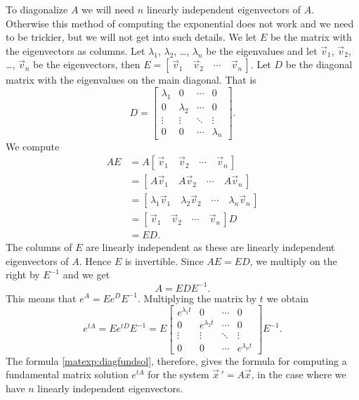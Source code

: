 \documentclass[12pt]{book}
\begin{document}
To diagonalize $A$
we will need $n$ linearly independent eigenvectors of $A$.
Otherwise this method of computing the exponential does not work and we need to be trickier, but we will
not get into such details.
We let $E$ be the matrix with the eigenvectors as columns.  
Let $\lambda_1$, $\lambda_2$, \ldots, $\lambda_n$ be the eigenvalues and
let $\vec{v}_1$, $\vec{v}_2$, \ldots, $\vec{v}_n$ be the eigenvectors, then
$E = [\, \vec{v}_1 \quad \vec{v}_2 \quad \cdots \quad \vec{v}_n \,]$.
Let $D$ be the diagonal matrix with the eigenvalues on the main diagonal.
That is
\begin{equation*}
D =
\begin{bmatrix}
\lambda_1 & 0 & \cdots & 0 \\
0 & \lambda_2 & \cdots & 0 \\
\vdots & \vdots & \ddots & \vdots \\
0 & 0 & \cdots & \lambda_n
\end{bmatrix} .
\end{equation*}
We compute
\begin{equation*}
\begin{split}
AE & = A 
[\, \vec{v}_1 \quad \vec{v}_2 \quad \cdots \quad \vec{v}_n \,]
\\
& =
[\, A\vec{v}_1 \quad A\vec{v}_2 \quad \cdots \quad A\vec{v}_n \,]
\\
& =
[\, \lambda_1 \vec{v}_1 \quad \lambda_2 \vec{v}_2 \quad \cdots \quad
\lambda_n \vec{v}_n \,]
\\
& =
[\, \vec{v}_1 \quad \vec{v}_2 \quad \cdots \quad \vec{v}_n \,] D
\\
& =
ED .
\end{split}
\end{equation*}
The columns of $E$ are linearly independent as these are
linearly independent eigenvectors of
$A$.  Hence $E$ is invertible.
Since $AE = ED$, we multiply on the right by $E^{-1}$ and we get
\begin{equation*}
A = E D E^{-1}.
\end{equation*}
This means that $e^A = E e^D E^{-1}$.  Multiplying the matrix by $t$ we obtain
\begin{equation} \label{matexp:diagfundsol}
\boxed{~~
e^{tA} = 
Ee^{tD}E^{-1} = 
E
\begin{bmatrix}
e^{\lambda_1 t} & 0 & \cdots & 0 \\
0 & e^{\lambda_2 t} & \cdots & 0 \\
\vdots & \vdots & \ddots & \vdots \\
0 & 0 & \cdots & e^{\lambda_n t}
\end{bmatrix} 
E^{-1} .
~~}
\end{equation}
The formula \eqref{matexp:diagfundsol}, therefore, gives the formula
for computing a fundamental matrix solution $e^{tA}$ for the
system ${\vec{x}\,}' = A \vec{x}$, in the case where we have
$n$ linearly independent eigenvectors.
\end{document}
